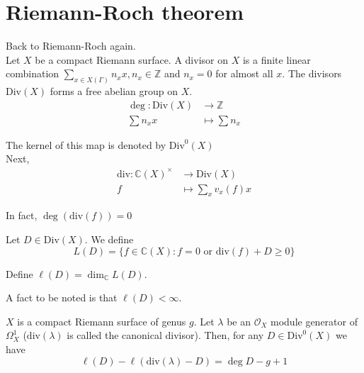 \documentclass[oneside, 12pt]{scrbook}
\newcommand{\CC}{\mathbb C}
\newcommand{\ZZ}{\mathbb Z}
\theoremstyle{theorem}
\begin{document}
\section{Riemann-Roch theorem}

Back to Riemann-Roch again. \\

Let $X$ be a compact Riemann surface. A divisor on $X$ is a finite linear combination $\sum_{x \in X(\Gamma)} n_{x}x , n_{x} \in \ZZ$ and $n_{x}=0$ for almost all $x$. The divisors $\mathrm{Div}(X)$ forms a free abelian group on $X$. \\

\begin{eqnarray}
\deg : \mathrm{Div}(X) &\longrightarrow \ZZ \\
\sum n_{x}x &\mapsto \sum n_{x}
\end{eqnarray}

The kernel of this map is denoted by $\mathrm{Div}^{0}(X)$ \\

Next, 
\begin{eqnarray}
\mathrm{div} : \CC(X)^{\times} &\longrightarrow \mathrm{Div}(X) \\
f &\mapsto \sum_{x} v_{x}(f) x
\end{eqnarray}

\begin{exercise}
In fact, $\deg(\mathrm{div}(f))=0$
\end{exercise}

Let $D\in \mathrm{Div}(X)$. We define \begin{equation}
L(D) = \{f \in \CC(X): f=0 \text{ or } \mathrm{div}(f) + D \geq 0\}
\end{equation}

Define $\ell (D) = \dim_{\CC} L (D)$. 

\begin{remark}
A fact to be noted is that $\ell (D) < \infty$.
\end{remark}

\begin{theorem}
$X$ is a compact Riemann surface of genus $g$. Let $\lambda$ be an $\mathcal{O}_{X}$ module generator of $\Omega_{X}^{1}$ ($\mathrm{div}(\lambda)$ is called the canonical divisor). Then, for any $D \in \mathrm{Div}^{0}(X)$ we have 
\begin{equation}
\ell (D)  - \ell(\mathrm{div}(\lambda) - D) = \deg D - g + 1
\end{equation}
\end{theorem}
\end{document}
